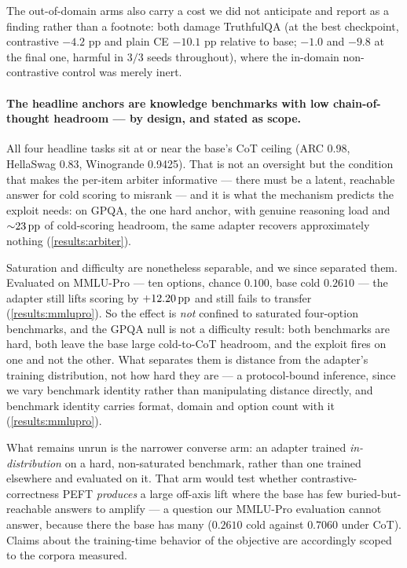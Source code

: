 The out-of-domain arms also carry a cost we did not anticipate and report as a
finding rather than a footnote: both damage TruthfulQA (at the best checkpoint,
contrastive $-4.2$ pp and plain CE $-10.1$ pp relative to base; $-1.0$ and $-9.8$ at
the final one, harmful in $3/3$ seeds throughout), where the in-domain
non-contrastive control was merely inert.

\paragraph{The headline anchors are knowledge benchmarks with low chain-of-thought
headroom --- by design, and stated as scope.}\label{lim:anchors}
All four headline tasks sit at or near the base's CoT ceiling (ARC 0.98, HellaSwag
0.83, Winogrande 0.9425). That is not an oversight but the condition that makes the
per-item arbiter informative --- there must be a latent, reachable answer for cold
scoring to misrank --- and it is what the mechanism predicts the exploit needs: on
GPQA, the one hard anchor, with genuine reasoning load and ${\sim}23\,\mathrm{pp}$ of
cold-scoring headroom, the same adapter recovers approximately nothing
(\cref{results:arbiter}).

Saturation and difficulty are nonetheless separable, and we since separated them.
Evaluated on MMLU-Pro --- ten options, chance $0.100$, base cold $0.2610$ --- the
adapter still lifts scoring by $+12.20\,\mathrm{pp}$ and still fails to transfer
(\cref{results:mmlupro}). So the effect is \emph{not} confined to saturated
four-option benchmarks, and the GPQA null is not a difficulty result: both
benchmarks are hard, both leave the base large cold-to-CoT headroom, and the exploit
fires on one and not the other. What separates them is distance from the adapter's
training distribution, not how hard they are --- a protocol-bound inference, since we
vary benchmark identity rather than manipulating distance directly, and benchmark
identity carries format, domain and option count with it (\cref{results:mmlupro}).

What remains unrun is the narrower converse arm: an adapter trained
\emph{in-distribution} on a hard, non-saturated benchmark, rather than one trained
elsewhere and evaluated on it. That arm would test whether contrastive-correctness
PEFT \emph{produces} a large off-axis lift where the base has few
buried-but-reachable answers to amplify --- a question our MMLU-Pro evaluation
cannot answer, because there the base has many ($0.2610$ cold against $0.7060$ under
CoT). Claims about the training-time behavior of the objective are accordingly
scoped to the corpora measured.

